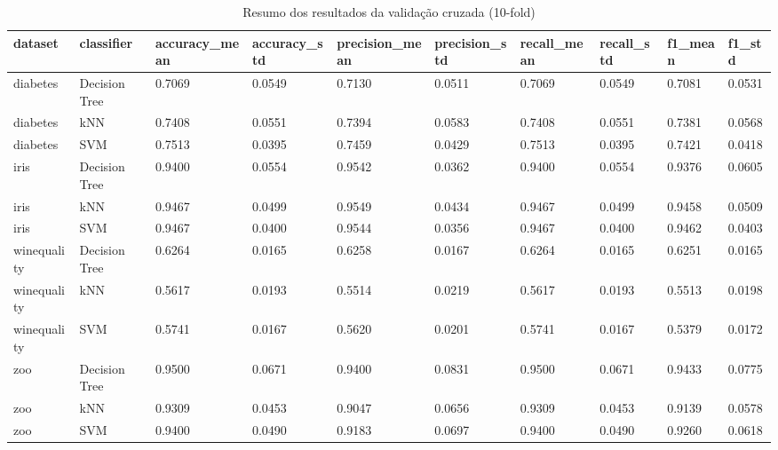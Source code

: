 \begin{table}[htbp]
\centering
\begin{tabular}{llllllllll}
\hline
dataset & classifier & accuracy\_mean & accuracy\_std & precision\_mean & precision\_std & recall\_mean & recall\_std & f1\_mean & f1\_std \\
\hline
diabetes & Decision Tree & 0.7069 & 0.0549 & 0.7130 & 0.0511 & 0.7069 & 0.0549 & 0.7081 & 0.0531 \\
diabetes & kNN & 0.7408 & 0.0551 & 0.7394 & 0.0583 & 0.7408 & 0.0551 & 0.7381 & 0.0568 \\
diabetes & SVM & 0.7513 & 0.0395 & 0.7459 & 0.0429 & 0.7513 & 0.0395 & 0.7421 & 0.0418 \\
iris & Decision Tree & 0.9400 & 0.0554 & 0.9542 & 0.0362 & 0.9400 & 0.0554 & 0.9376 & 0.0605 \\
iris & kNN & 0.9467 & 0.0499 & 0.9549 & 0.0434 & 0.9467 & 0.0499 & 0.9458 & 0.0509 \\
iris & SVM & 0.9467 & 0.0400 & 0.9544 & 0.0356 & 0.9467 & 0.0400 & 0.9462 & 0.0403 \\
winequality & Decision Tree & 0.6264 & 0.0165 & 0.6258 & 0.0167 & 0.6264 & 0.0165 & 0.6251 & 0.0165 \\
winequality & kNN & 0.5617 & 0.0193 & 0.5514 & 0.0219 & 0.5617 & 0.0193 & 0.5513 & 0.0198 \\
winequality & SVM & 0.5741 & 0.0167 & 0.5620 & 0.0201 & 0.5741 & 0.0167 & 0.5379 & 0.0172 \\
zoo & Decision Tree & 0.9500 & 0.0671 & 0.9400 & 0.0831 & 0.9500 & 0.0671 & 0.9433 & 0.0775 \\
zoo & kNN & 0.9309 & 0.0453 & 0.9047 & 0.0656 & 0.9309 & 0.0453 & 0.9139 & 0.0578 \\
zoo & SVM & 0.9400 & 0.0490 & 0.9183 & 0.0697 & 0.9400 & 0.0490 & 0.9260 & 0.0618 \\
\hline
\end{tabular}
\caption{Resumo dos resultados da validação cruzada (10-fold)}
\label{tab:ex3-summary}
\end{table}